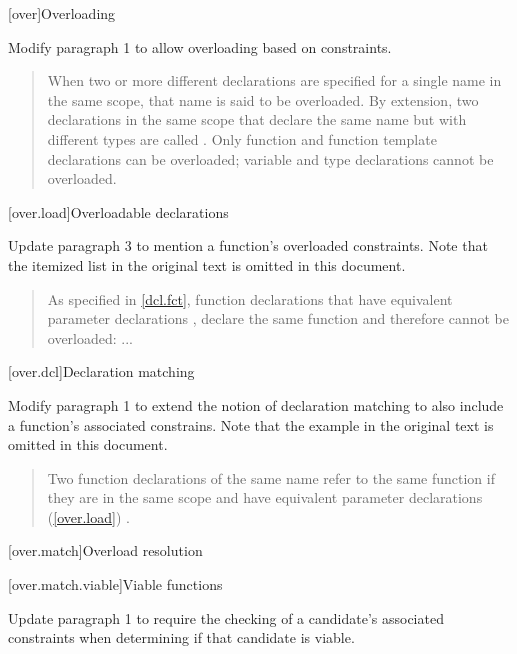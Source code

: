 
\setcounter{chapter}{12}
[over]{Overloading}

Modify paragraph 1 to allow overloading based on constraints.

\begin{quote}
\pnum
When two or more different declarations are specified for a single name 
in the same scope, that name is said to be overloaded. By extension, two 
declarations in the same scope that declare the same name but with
different types 
are called . Only function and function 
template declarations can be overloaded; variable and type declarations 
cannot be overloaded.
\end{quote}

[over.load]{Overloadable declarations}

Update paragraph 3 to mention a function's overloaded constraints. 
Note that the itemized list in the original text is omitted in this
document.

\begin{quote}
\setcounter{Paras}{2}
\pnum
\enternote
As specified in \ref{dcl.fct}, function declarations that have equivalent 
parameter declarations , declare the same function and therefore cannot be 
overloaded: ...
\exitnote
\end{quote}


[over.dcl]{Declaration matching}

Modify paragraph 1 to extend the notion of declaration matching to
also include a function's associated constrains. Note that the
example in the original text is omitted in this document.

\begin{quote}
Two function declarations of the same name refer to the same function if 
they are in the same scope and have equivalent parameter declarations 
(\ref{over.load}) .
\end{quote}


\setcounter{section}{2}
[over.match]{Overload resolution}


\setcounter{subsection}{1}
[over.match.viable]{Viable functions}

Update paragraph 1 to require the checking of a candidate's associated
constraints when determining if that candidate is viable.

